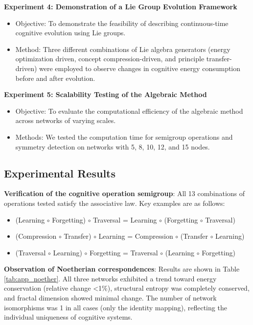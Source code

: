 \documentclass[10pt,onecolumn]{article}
\begin{document}
\textbf{Experiment 4: Demonstration of a Lie Group Evolution Framework}
\begin{itemize}
    \item Objective: To demonstrate the feasibility of describing continuous-time cognitive evolution using Lie groups.
    \item Method: Three different combinations of Lie algebra generators (energy optimization driven, concept compression-driven, and principle transfer-driven) were employed to observe changes in cognitive energy consumption before and after evolution.
\end{itemize}

\textbf{Experiment 5: Scalability Testing of the Algebraic Method}
\begin{itemize}
    \item Objective: To evaluate the computational efficiency of the algebraic method across networks of varying scales.
    \item Methods: We tested the computation time for semigroup operations and symmetry detection on networks with 5, 8, 10, 12, and 15 nodes.
\end{itemize}

\subsection{Experimental Results}

\textbf{Verification of the cognitive operation semigroup}: All 13 combinations of operations tested satisfy the associative law. Key examples are as follows:
\begin{itemize}
    \item (Learning $\circ$ Forgetting) $\circ$ Traversal = Learning $\circ$ (Forgetting $\circ$ Traversal)
    \item (Compression $\circ$ Transfer) $\circ$ Learning = Compression $\circ$ (Transfer $\circ$ Learning)
    \item (Traversal $\circ$ Learning) $\circ$ Forgetting = Traversal $\circ$ (Learning $\circ$ Forgetting)
\end{itemize}

\textbf{Observation of Noetherian correspondences}: Results are shown in Table \ref{tab:app_noether}. All three networks exhibited a trend toward energy conservation (relative change <1\%), structural entropy was completely conserved, and fractal dimension showed minimal change. The number of network isomorphisms was 1 in all cases (only the identity mapping), reflecting the individual uniqueness of cognitive systems.
\end{document}
